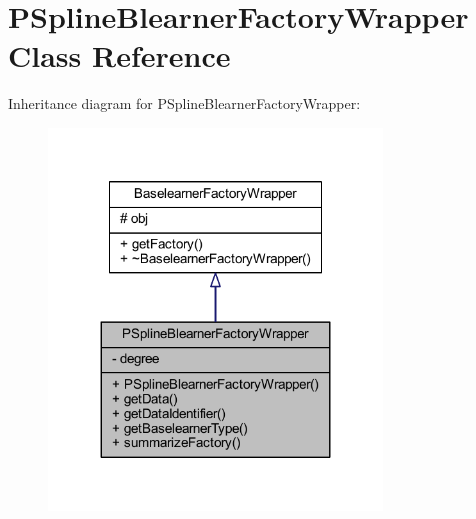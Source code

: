 \hypertarget{class_p_spline_blearner_factory_wrapper}{}\section{P\+Spline\+Blearner\+Factory\+Wrapper Class Reference}
\label{class_p_spline_blearner_factory_wrapper}


Inheritance diagram for P\+Spline\+Blearner\+Factory\+Wrapper\+:
\nopagebreak
\begin{figure}[H]
\begin{center}
\leavevmode
\includegraphics[width=251pt]{class_p_spline_blearner_factory_wrapper__inherit__graph}
\end{center}
\end{figure}



